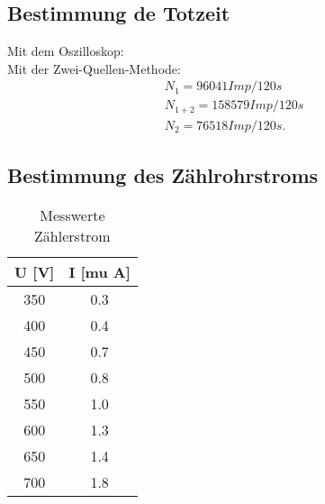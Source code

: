 \subsection{Bestimmung de Totzeit}
Mit dem Oszilloskop:\\
Mit der Zwei-Quellen-Methode:\\
\begin{align*}
  N_1 = 96041 Imp/120s\\
  N_{1+2} = 158579 Imp/120s\\
  N_2 = 76518 Imp/120s.
\end{align*}

\subsection{Bestimmung des Zählrohrstroms}
\begin{table*} [h]
  \centering
  \caption{Messwerte Zählerstrom}
  \label{tab:Messdaten Zaehlerstrom}
  \begin{tabular}{cc}
  \toprule
    U [V] & I [mu A]\\
    \midrule
    350 & 0.3\\
    400	& 0.4\\
    450	& 0.7\\
    500	& 0.8\\
    550	& 1.0\\
    600	& 1.3\\
    650	& 1.4\\
    700	& 1.8\\
    \bottomrule
  \end{tabular}
  \end{table*}


